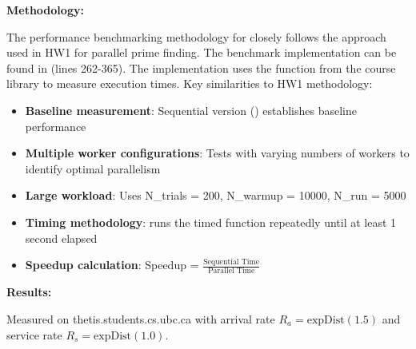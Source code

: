 
\textbf{Methodology:}

The performance benchmarking methodology for  closely follows the approach used in HW1 for parallel prime finding. The benchmark implementation can be found in  (lines 262-365). The implementation uses the  function from the course library to measure execution times. Key similarities to HW1 methodology:
\begin{itemize}
    \item \textbf{Baseline measurement}: Sequential version () establishes baseline performance
    \item \textbf{Multiple worker configurations}: Tests with varying numbers of workers to identify optimal parallelism
    \item \textbf{Large workload}: Uses N\_trials = 200, N\_warmup = 10000, N\_run = 5000
    \item \textbf{Timing methodology}:  runs the timed function repeatedly until at least 1 second elapsed
    \item \textbf{Speedup calculation}: Speedup = $\frac{\text{Sequential Time}}{\text{Parallel Time}}$
\end{itemize}

\textbf{Results:}

Measured on thetis.students.cs.ubc.ca with arrival rate $R_a = \text{expDist}(1.5)$ and service rate $R_s = \text{expDist}(1.0)$.


